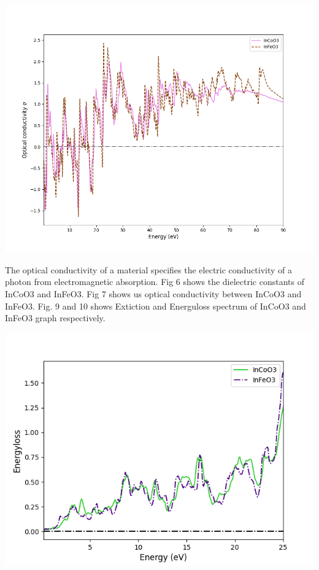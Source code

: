 \documentclass[12pt, letterpaper]{article}
\newcommand*{\1}{\hspace{1pt}}
\begin{document}
    \begin{adjustbox}{center,caption={Optical Conductivity of InCoO3 and InFeO3(Imaginary)},label={somelabel},nofloat=figure,vspace=\bigskipamount}
        \includegraphics[width=\textwidth]{opcondimagev}
    \end{adjustbox}
    The optical conductivity of a material specifies the electric 
    conductivity of a photon from electromagnetic absorption. Fig 6 shows the dielectric constants of InCoO3 and InFeO3. Fig 7 shows us optical conductivity between
    InCoO3 and InFeO3. Fig. 9 and 10 shows Extiction and Energuloss spectrum of InCoO3
    and InFeO3 graph respectively.

    \begin{adjustbox}{center,caption={Extiction graph of INCoO3 and InFeO3},label={somelabel},nofloat=figure,}
        \includegraphics[width=\textwidth]{ex}
    \end{adjustbox}
    
\end{document}
